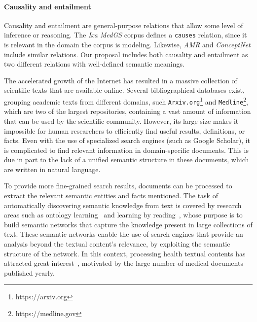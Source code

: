  \paragraph{Causality and entailment}
  Causality and entailment are general-purpose relations that allow some level of inference or reasoning. The \textit{Ixa MedGS} corpus defines a \texttt{causes} relation, since it is relevant in the domain the corpus is modeling. Likewise, \textit{AMR} and \textit{ConceptNet} include similar relations. Our proposal includes both causality and entailment as two different relations with well-defined semantic meanings.


  The accelerated growth of the Internet has resulted in a massive collection of scientific texts that are available online.
Several bibliographical databases exist, grouping academic texts from different domains, such \texttt{Arxiv.org}\footnote{https://arxiv.org} and
\texttt{Medline}\footnote{https://medline.gov},
which are two of the largest repositories, containing a vast amount of information that can be used by the scientific community.
However, its large size makes it impossible for human researchers to efficiently find useful results, definitions, or facts.
Even with the use of specialized search engines (such as Google Scholar), it is complicated to find relevant information in domain-specific documents.
This is due in part to the lack of a unified semantic structure in these documents, which are written in natural language.

To provide more fine-grained search results, documents can be processed to extract the relevant semantic entities and facts mentioned.
The task of automatically discovering semantic knowledge from text is covered by research areas
such as ontology learning~\cite{cimiano2009ontology} and {learning by reading}~\cite{barker2007learning},
whose purpose is to build semantic networks that {capture} the knowledge present in large collections of text.
These semantic networks enable the use of search engines that provide an analysis beyond the textual content's relevance, by exploiting the semantic structure of the network.
In this context, processing health textual contents has attracted {great interest}~\cite{gonzalez2017capturing}, motivated by the large number of medical documents published yearly.

